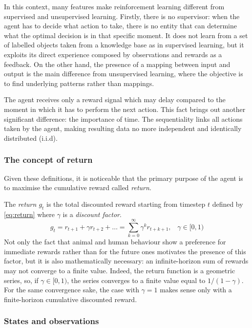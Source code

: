 In this context, many features make reinforcement learning different from supervised and unsupervised learning.
Firstly, there is no supervisor: when the agent has to decide what action to take, there is no entity that can determine what the optimal decision is in that specific moment. It does not learn from a set of labelled objects taken from a knowledge base as in supervised learning, but it exploits its direct experience composed by observations and rewards as a feedback. On the other hand, the presence of a mapping between input and output is the main difference from unsupervised learning, where the objective is to find underlying patterns rather than mappings.

The agent receives only a reward signal which may delay compared to the moment in which it has to perform the next action. This fact brings out another significant difference: the importance of time. The sequentiality links all actions taken by the agent, making resulting data no more independent and identically distributed (i.i.d).

\subsubsection{The concept of return}

Given these definitions, it is noticeable that the primary purpose of the agent is to maximise the cumulative reward called \textit{return}.


The \textit{return $g_t$} is the total discounted reward starting from timestep $t$ defined by \vref{eq:return} where $\gamma$ is a \textit{discount factor}.
\begin{equation} \label{eq:return}
	g_t = r_{t+1} + \gamma r_{t+2} + \dots = \sum_{k=0}^{\infty} \gamma^k r_{t+k+1}, \;\;\;\gamma \in [0,1)
\end{equation}
Not only the fact that animal and human behaviour show a preference for immediate rewards rather than for the future ones motivates the presence of this factor, but it is also mathematically necessary: an infinite-horizon sum of rewards may not converge to a finite value. Indeed, the return function is a geometric series, so, if $\gamma \in [0,1)$, the series converges to a finite value equal to $1/(1-\gamma)$. For the same convergence sake, the case with $\gamma = 1$ makes sense only with a finite-horizon cumulative discounted reward.

\subsubsection{States and observations}

